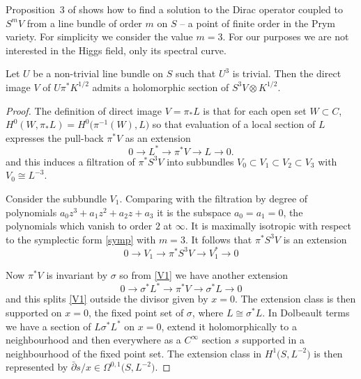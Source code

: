 \documentclass[pdftex]{sigma}
\begin{document}
Proposition~3 of \cite{Hitchin2} shows how to find a solution to the Dirac operator coupled to $S^mV$ from a line bundle of order $m$ on $S$ -- a point of finite order in the Prym variety. For simplicity we consider the value $m=3$. For our purposes we are not interested in the Higgs field, only its spectral curve.

\begin{proposition} Let $U$ be a non-trivial line bundle on $S$ such that $U^3$ is trivial. Then the direct image $V$ of $U\pi^*K^{1/2}$ admits a holomorphic section of $S^3V\otimes K^{1/2}$.
\end{proposition}

\begin{proof} The definition of direct image $V=\pi_*L$ is that for each open set $W\subset C$, $H^0(W, \pi_*L)=H^0\big(\pi^{-1}(W), L\big)$ so that evaluation of a local section of $L$ expresses the pull-back $\pi^*V$ as an extension{\samepage
\begin{equation}
0\rightarrow L^*\rightarrow \pi^*V\rightarrow L\rightarrow 0.
\label{V1}
\end{equation}
and this induces a filtration of $\pi^*S^3V$ into subbundles $V_0\subset V_1\subset V_2\subset V_3$ with $V_0\cong L^{-3}$.}

Consider the subbundle $V_1$. Comparing with the filtration by degree of polynomials $a_0z^3+a_1z^{2}+a_2z+a_3$ it is the subspace $a_0=a_{1}=0$, the polynomials which vanish to order $2$ at $\infty$. It is maximally isotropic with respect to the symplectic form \eqref{symp} with $m=3$.
It follows that $\pi^*S^3V$ is an extension
\begin{equation}
0\rightarrow V_1\rightarrow \pi^*S^3V\rightarrow V_1^*\rightarrow 0
\label{ext}
\end{equation}

Now $\pi^*V$ is invariant by $\sigma$ so from \eqref{V1} we have another extension
\begin{displaymath}0\rightarrow \sigma^*L^*\rightarrow \pi^*V\rightarrow \sigma^*L\rightarrow 0\end{displaymath}
and this splits \eqref{V1} outside the divisor given by $x=0$. The extension class is then supported on $x=0$, the fixed point set of $\sigma$, where $L\cong \sigma^*L$. In Dolbeault terms
we have a section of $L\sigma^*L^*$ on $x=0$, extend it holomorphically to a neighbourhood and then everywhere as a $C^{\infty}$ section $s$ supported in a neighbourhood of the fixed point set. The extension class in $H^1\big(S,L^{-2}\big)$ is then represented by $\bar\partial s/x\in \Omega^{0,1}\big(S, L^{-2}\big)$.


\end{proof}
\end{document}
